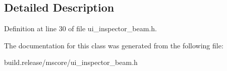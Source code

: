\subsection{Detailed Description}


Definition at line 30 of file ui\+\_\+inspector\+\_\+beam.\+h.



The documentation for this class was generated from the following file\+:\begin{DoxyCompactItemize}
\item 
build.\+release/mscore/ui\+\_\+inspector\+\_\+beam.\+h\end{DoxyCompactItemize}
